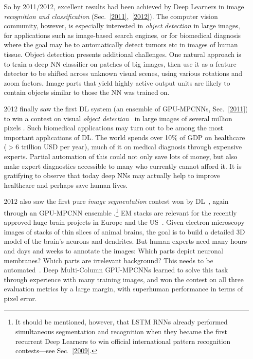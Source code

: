 \documentclass[letterpaper]{article}
\begin{document}
\begin{CJK*}{UTF8}{gbsn}
So by 2011/2012, excellent results had been achieved by Deep Learners 
in image {\em recognition and classification} (Sec.~\ref{2011},~\ref{2012}).
The computer vision community, however, is especially interested in
 {\em object  detection} in large images,
for applications such as image-based search engines,
or for biomedical diagnosis where the goal may be to 
automatically detect tumors etc in images of human tissue.
Object detection presents additional challenges. 
One natural approach is to train a deep NN classifier on patches of big images,
then use it as a feature detector to be shifted 
across unknown visual scenes, using various rotations and zoom factors.
Image parts that yield highly active output units are likely
to contain objects similar to those the NN was trained on.

2012 finally saw the first DL system 
(an ensemble of GPU-MPCNNs, Sec.~\ref{2011}) to win a
contest on visual {\em object detection}~\citep{miccai2013} in large images of
several million pixels
\citep{icpr12,icpr12report}. 
Such biomedical applications may turn out to be among 
the most important applications of DL.
 The world spends over 10\% of GDP on healthcare ($>6$ trillion USD per year), much of it on medical diagnosis through expensive experts. Partial automation of this could not only save lots of money, but also make expert diagnostics accessible to many who currently cannot afford it.
It is gratifying to observe that today deep NNs may actually help to improve healthcare and 
perhaps save human lives. 


2012 also saw the 
first pure {\em image segmentation} contest won by DL~\citep{ciresan2012nips}, 
again through an GPU-MPCNN ensemble 
\citep{isbi12}.\footnote{It should be mentioned, however, that LSTM RNNs already performed simultaneous segmentation and recognition when they became the first recurrent Deep Learners to win official international pattern recognition contests---see Sec.~\ref{2009}.}
EM stacks are relevant for the recently approved huge brain projects in Europe and the US~\citep[e.g.,][]{markram2012}. Given electron microscopy images of stacks of thin slices of animal brains, the goal is to build a detailed 3D model of the brain's neurons and dendrites. But human experts need many hours and days and weeks to annotate the images: Which parts depict neuronal membranes? Which parts are irrelevant background? This needs to be automated~\citep[e.g.,][]{turaga2010}. Deep Multi-Column GPU-MPCNNs learned to solve this task through experience with many training images, and won the contest on all three evaluation metrics by a large margin, with superhuman performance in terms of pixel error. 


\end{CJK*}
\end{document}
